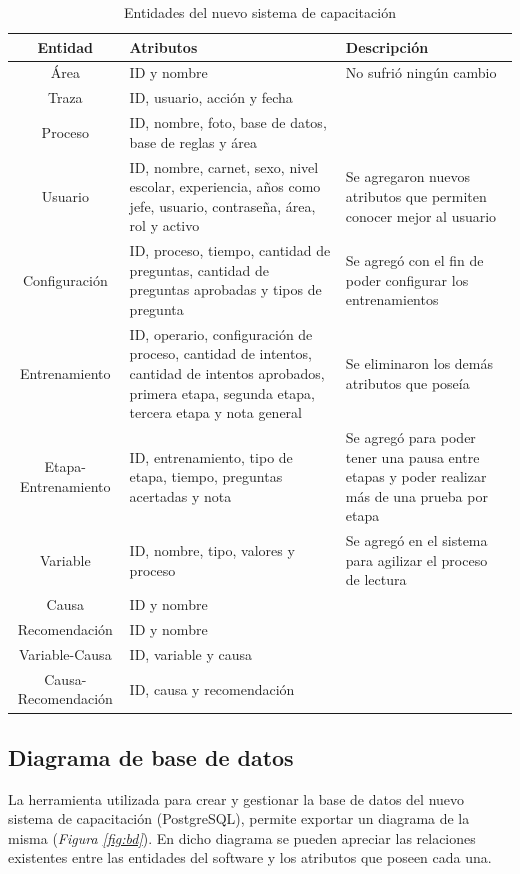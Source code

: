 \begin{table}[H]
\centering
\begin{center}
\begin{tabular}{ | c | p{5cm} |  p{5cm} | }
\hline
\textbf{Entidad} & \textbf{Atributos}  & \textbf{Descripción}\\
\hline
Área & ID y nombre & No sufrió ningún cambio \\
\cline{1-2}
Traza & ID, usuario, acción y fecha &  \\
\cline{1-2}
Proceso & ID, nombre, foto, base de datos, base de reglas y área &  \\
\hline
Usuario & ID, nombre, carnet, sexo, nivel escolar, experiencia, años como jefe, usuario, contraseña, área, rol y activo & Se agregaron nuevos atributos que permiten conocer mejor al usuario\\
\hline
Configuración & ID, proceso, tiempo, cantidad de preguntas, cantidad de preguntas aprobadas y tipos de pregunta & Se agregó con el fin de poder configurar los entrenamientos \\
\hline
Entrenamiento & ID, operario, configuración de proceso, cantidad de intentos, cantidad de intentos aprobados, primera etapa, segunda etapa, tercera etapa y nota general & Se eliminaron los demás atributos que poseía \\
\hline
Etapa-Entrenamiento & ID, entrenamiento, tipo de etapa, tiempo, preguntas acertadas y nota & Se agregó para poder tener una pausa entre etapas y poder realizar más de una prueba por etapa \\
\hline
Variable & ID, nombre, tipo, valores y proceso & Se agregó en el sistema para agilizar el proceso de lectura \\
\cline{1-2}
Causa & ID y nombre &  \\
\cline{1-2}
Recomendación & ID y nombre & \\
\cline{1-2}
Variable-Causa & ID, variable y causa &  \\
\cline{1-2}
Causa-Recomendación & ID, causa y recomendación &  \\
\hline
\end{tabular}
\caption{Entidades del nuevo sistema de capacitación}
\label{tab:entidades}
\end{center}
\end{table}

\subsection{Diagrama de base de datos}
La herramienta utilizada para crear y gestionar la base de datos del nuevo sistema de capacitación (PostgreSQL), permite exportar un diagrama de la misma (\textsl{Figura \ref{fig:bd}}). En dicho diagrama se pueden apreciar las relaciones existentes entre las entidades del software y los atributos que poseen cada una.

